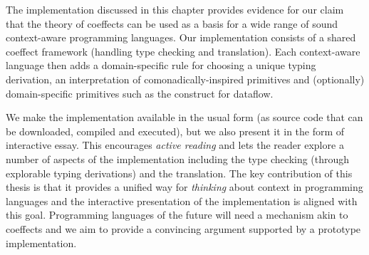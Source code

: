 The implementation discussed in this chapter provides evidence for our claim that the
theory of coeffects can be used as a basis for a wide range of sound context-aware programming
languages. Our implementation consists of a shared coeffect framework (handling type checking and
translation). Each context-aware language then adds a domain-specific rule for choosing a unique
typing derivation, an interpretation of comonadically-inspired primitives and (optionally)
domain-specific primitives such as the  construct for dataflow.

We make the implementation available in the usual form (as source code that can be downloaded,
compiled and executed), but we also present it in the form of interactive essay. This encourages
\emph{active reading} and lets the reader explore a number of aspects of the implementation
including the type checking (through explorable typing derivations) and the translation. The key
contribution of this thesis is that it provides a unified way for \emph{thinking} about context in
programming languages and the interactive presentation of the implementation is aligned with this
goal. Programming languages of the future will need a mechanism akin to coeffects and we aim to
provide a convincing argument supported by a prototype implementation.
